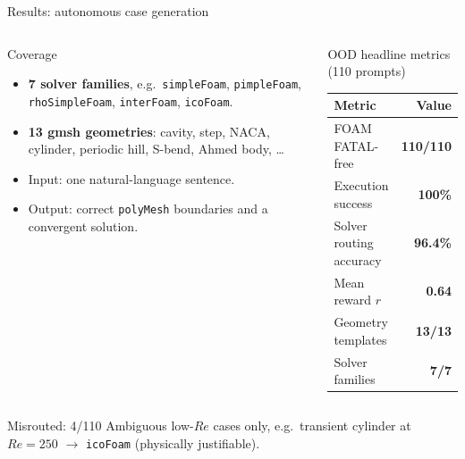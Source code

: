 \documentclass[aspectratio=169,10pt]{beamer}
\begin{document}
\begin{frame}{Results: autonomous case generation}
\begin{columns}[T,onlytextwidth]
\begin{block}{Coverage}
\begin{itemize}\small
  \item \textbf{7 solver families}, e.g.\ \texttt{simpleFoam}, \texttt{pimpleFoam}, \texttt{rhoSimpleFoam}, \texttt{interFoam}, \texttt{icoFoam}.
  \item \textbf{13 gmsh geometries}: cavity, step, NACA, cylinder, periodic hill, S-bend, Ahmed body, \dots
  \item Input: one natural-language sentence.
  \item Output: correct \texttt{polyMesh} boundaries and a convergent solution.
\end{itemize}
\end{block}
\begin{exampleblock}{OOD headline metrics (110 prompts)}
\centering\small
\begin{tabular}{lr}
\toprule
\textbf{Metric} & \textbf{Value} \\
\midrule
FOAM FATAL-free & \textbf{110/110} \\
Execution success & \textbf{100\%} \\
Solver routing accuracy & \textbf{96.4\%} \\
Mean reward $r$ & \textbf{0.64} \\
Geometry templates & \textbf{13/13} \\
Solver families & \textbf{7/7} \\
\bottomrule
\end{tabular}
\end{exampleblock}
\end{columns}
\vspace{0.1cm}
\begin{alertblock}{Misrouted: 4/110}
\footnotesize Ambiguous low-$Re$ cases only, e.g.\ transient cylinder at $Re=250$ $\to$ \texttt{icoFoam} (physically justifiable).
\end{alertblock}
\end{frame}
\end{document}
